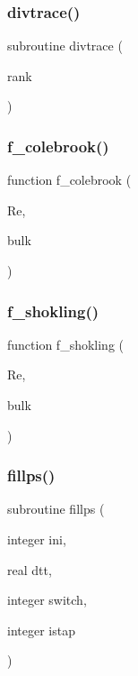 \subsubsection{\texorpdfstring{divtrace()}{divtrace()}}
{\footnotesize\ttfamily subroutine divtrace (\begin{DoxyParamCaption}\item[{}]{rank }\end{DoxyParamCaption})}

\mbox{\label{main__comp_8f_a101cc571e6df94902bbcd02e4b448fa2}} 
\subsubsection{\texorpdfstring{f\+\_\+colebrook()}{f\_colebrook()}}
{\footnotesize\ttfamily function f\+\_\+colebrook (\begin{DoxyParamCaption}\item[{}]{Re,  }\item[{}]{bulk }\end{DoxyParamCaption})}

\mbox{\label{main__comp_8f_ad0b949695373696aebb05bf260a06b37}} 
\subsubsection{\texorpdfstring{f\+\_\+shokling()}{f\_shokling()}}
{\footnotesize\ttfamily function f\+\_\+shokling (\begin{DoxyParamCaption}\item[{}]{Re,  }\item[{}]{bulk }\end{DoxyParamCaption})}

\mbox{\label{main__comp_8f_a3ae77187a10bbcfa88368b904b5b878c}} 
\subsubsection{\texorpdfstring{fillps()}{fillps()}}
{\footnotesize\ttfamily subroutine fillps (\begin{DoxyParamCaption}\item[{integer}]{ini,  }\item[{real}]{dtt,  }\item[{integer}]{switch,  }\item[{integer}]{istap }\end{DoxyParamCaption})}

